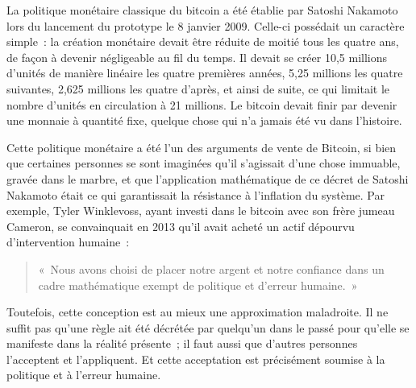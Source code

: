 La politique monétaire classique du bitcoin a été établie par Satoshi Nakamoto lors du lancement du prototype le 8 janvier 2009. Celle-ci possédait un caractère simple~: la création monétaire devait être réduite de moitié tous les quatre ans, de façon à devenir négligeable au fil du temps. Il devait se créer 10,5 millions d'unités de manière linéaire les quatre premières années, 5,25 millions les quatre suivantes, 2,625 millions les quatre d'après, et ainsi de suite, ce qui limitait le nombre d'unités en circulation à 21 millions. Le bitcoin devait finir par devenir une monnaie à quantité fixe, quelque chose qui n'a jamais été vu dans l'histoire. %

Cette politique monétaire a été l'un des arguments de vente de Bitcoin, si bien que certaines personnes se sont imaginées qu'il s'agissait d'une chose immuable, gravée dans le marbre, et que l'application mathématique de ce décret de Satoshi Nakamoto était ce qui garantissait la résistance à l'inflation du système. Par exemple, Tyler Winklevoss, ayant investi dans le bitcoin avec son frère jumeau Cameron, se convainquait en 2013 qu'il avait acheté un actif dépourvu d'intervention humaine~:

\begin{quote}
«~Nous avons choisi de placer notre argent et notre confiance dans un cadre mathématique exempt de politique et d'erreur humaine.~»
\end{quote} %

Toutefois, cette conception est au mieux une approximation maladroite. Il ne suffit pas qu'une règle ait été décrétée par quelqu'un dans le passé pour qu'elle se manifeste dans la réalité présente~; il faut aussi que d'autres personnes l'acceptent et l'appliquent. Et cette acceptation est précisément soumise à la politique et à l'erreur humaine.

